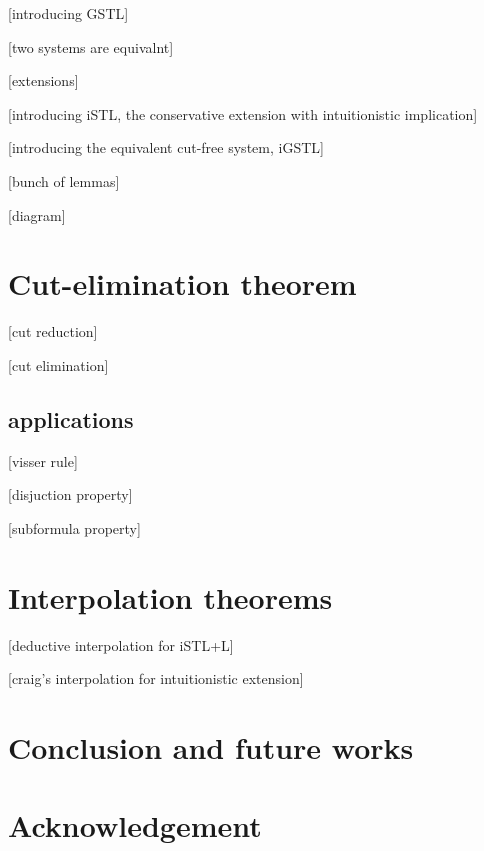 \documentclass[12pt,a4paper]{article}
\begin{document}
	\begin{prooftree}
	\end{prooftree}




[introducing GSTL]

[two systems are equivalnt]

[extensions]

[introducing iSTL, the conservative extension with intuitionistic implication]

[introducing the equivalent cut-free system, iGSTL]

[bunch of lemmas]

[diagram]

\section{Cut-elimination theorem}
[cut reduction]

[cut elimination]

\subsection{applications}
[visser rule]

[disjuction property]

[subformula property]

\section{Interpolation theorems}
[deductive interpolation for iSTL+L]

[craig's interpolation for intuitionistic extension]

\section{Conclusion and future works}

\section{Acknowledgement}



\end{document}
